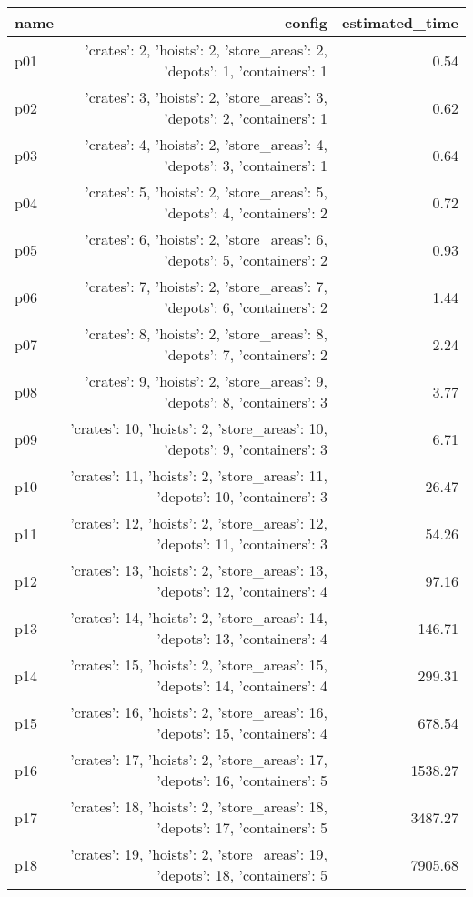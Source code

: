 \documentclass{article}
\begin{document}
                            \begin{center}
                            \scriptsize
                            \begin{tabular}{@{}l|r|r@{}}
                            name & config & estimated\_time\\\midrule
                              p01&{'crates': 2, 'hoists': 2, 'store\_areas': 2, 'depots': 1, 'containers': 1}&0.54\\
  p02&{'crates': 3, 'hoists': 2, 'store\_areas': 3, 'depots': 2, 'containers': 1}&0.62\\
  p03&{'crates': 4, 'hoists': 2, 'store\_areas': 4, 'depots': 3, 'containers': 1}&0.64\\
  p04&{'crates': 5, 'hoists': 2, 'store\_areas': 5, 'depots': 4, 'containers': 2}&0.72\\
  p05&{'crates': 6, 'hoists': 2, 'store\_areas': 6, 'depots': 5, 'containers': 2}&0.93\\
  p06&{'crates': 7, 'hoists': 2, 'store\_areas': 7, 'depots': 6, 'containers': 2}&1.44\\
  p07&{'crates': 8, 'hoists': 2, 'store\_areas': 8, 'depots': 7, 'containers': 2}&2.24\\
  p08&{'crates': 9, 'hoists': 2, 'store\_areas': 9, 'depots': 8, 'containers': 3}&3.77\\
  p09&{'crates': 10, 'hoists': 2, 'store\_areas': 10, 'depots': 9, 'containers': 3}&6.71\\
  p10&{'crates': 11, 'hoists': 2, 'store\_areas': 11, 'depots': 10, 'containers': 3}&26.47\\
  p11&{'crates': 12, 'hoists': 2, 'store\_areas': 12, 'depots': 11, 'containers': 3}&54.26\\
  p12&{'crates': 13, 'hoists': 2, 'store\_areas': 13, 'depots': 12, 'containers': 4}&97.16\\
  p13&{'crates': 14, 'hoists': 2, 'store\_areas': 14, 'depots': 13, 'containers': 4}&146.71\\
  p14&{'crates': 15, 'hoists': 2, 'store\_areas': 15, 'depots': 14, 'containers': 4}&299.31\\
  p15&{'crates': 16, 'hoists': 2, 'store\_areas': 16, 'depots': 15, 'containers': 4}&678.54\\
  p16&{'crates': 17, 'hoists': 2, 'store\_areas': 17, 'depots': 16, 'containers': 5}&1538.27\\
  p17&{'crates': 18, 'hoists': 2, 'store\_areas': 18, 'depots': 17, 'containers': 5}&3487.27\\
  p18&{'crates': 19, 'hoists': 2, 'store\_areas': 19, 'depots': 18, 'containers': 5}&7905.68\\

\end{tabular}
\end{center}
\end{document}
